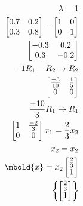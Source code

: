 \documentclass[12pt letter]{report}
\begin{document}
{\begin{align*}
    \\
    \lambda = 1                                                                                                      \\
    \begin{bmatrix} 0.7 & 0.2 \\ 0.3 & 0.8 \end{bmatrix} - \begin{bmatrix} 1 & 0 \\ 0 & 1 \end{bmatrix}              \\
    \begin{bmatrix}
      -0.3 & 0.2  \\
      0.3  & -0.2
    \end{bmatrix}                                                                                                   \\
    -1R_1 - R_2  \rightarrow R_2                                                                                     \\
    \begin{bmatrix}
      \frac{-3}{10} & \frac{1}{5} \\
      0             & 0           \\
    \end{bmatrix}
    \\
    \frac{-10}{3}R_1 \to R_1                                                                                         \\
    \begin{bmatrix}
      1 & \frac{-2}{3} \\
      0 & 0            \\
    \end{bmatrix}
    x_1 = \frac{2}{3}x_2                                                                                             \\
    x_2 = x_2                                                                                                        \\
    \mbold{x} = x_2\begin{bmatrix} \frac{2}{3} \\ 1 \end{bmatrix}                                                    \\
    \left\{ \begin{bmatrix} \frac{2}{3} \\ 1 \end{bmatrix} \right\}
  \end{align*}

}
\end{document}
